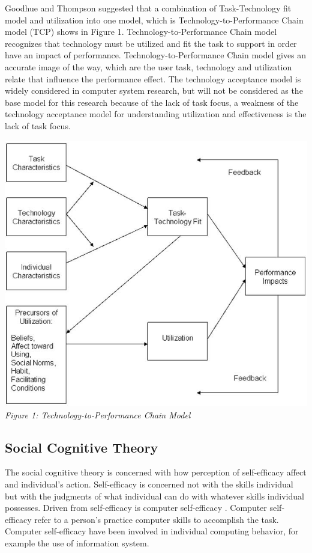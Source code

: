 \documentclass[a4paper, 12pt]{article}
\begin{document}
Goodhue and Thompson \cite{goodhue1995task}suggested that a combination of Task-Technology fit model and utilization into one model, which is Technology-to-Performance Chain model (TCP) shows in Figure 1.  Technology-to-Performance Chain model recognizes that technology must be utilized and fit the task to support in order have an impact of performance. Technology-to-Performance Chain model gives an accurate image of the way, which are the user task, technology and utilization relate that influence the performance effect. The technology acceptance model is widely considered in computer system research, but will not be considered as the base model for this research because of the lack of task focus, a weakness of the technology acceptance model for understanding utilization and effectiveness is the lack of task focus.

\begin{center}
\includegraphics[scale=0.5]{figure1.png}\\
\textit{Figure 1: Technology-to-Performance Chain Model}
\end{center}
\subsection{Social Cognitive Theory}

The social cognitive theory is concerned with how perception of self-efficacy affect and individual’s action. Self-efficacy is concerned not with the skills individual but with the judgments of what individual can do with whatever skills individual possesses. Driven from self-efficacy is computer self-efficacy \cite{davis1989user}. Computer self-efficacy refer to a person’s practice computer skills to accomplish the task.  Computer self-efficacy have been involved in individual computing behavior, for example the use of information system.
\end{document}
